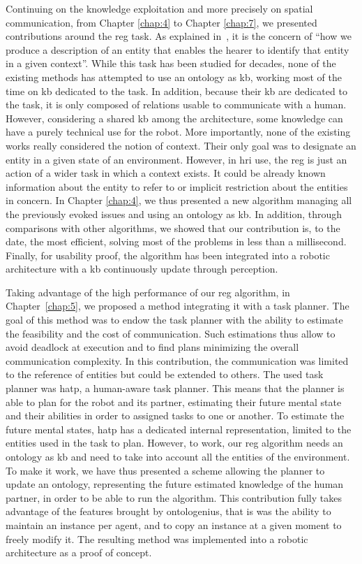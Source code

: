 Continuing on the knowledge exploitation and more precisely on spatial communication, from Chapter \ref{chap:4} to Chapter \ref{chap:7}, we presented contributions around the \acrfull{reg} task. As explained in~\cite{reiter_2000_building}, it is the concern of ``how we produce a description of an entity that enables the hearer to identify that entity in a given context''. While this task has been studied for decades, none of the existing methods has attempted to use an ontology as \acrshort{kb}, working most of the time on \acrshort{kb} dedicated to the task. In addition, because their \acrshort{kb} are dedicated to the task, it is only composed of relations usable to communicate with a human. However, considering a shared \acrshort{kb} among the architecture, some knowledge can have a purely technical use for the robot. More importantly, none of the existing works really considered the notion of context. Their only goal was to designate an entity in a given state of an environment. However, in \acrshort{hri} use, the \acrshort{reg} is just an action of a wider task in which a context exists. It could be already known information about the entity to refer to or implicit restriction about the entities in concern. In Chapter \ref{chap:4}, we thus presented a new algorithm managing all the previously evoked issues and using an ontology as \acrshort{kb}. In addition, through comparisons with other algorithms, we showed that our contribution is, to the date, the most efficient, solving most of the problems in less than a millisecond. Finally, for usability proof, the algorithm has been integrated into a robotic architecture with a \acrshort{kb} continuously update through perception.

Taking advantage of the high performance of our \acrshort{reg} algorithm, in Chapter~\ref{chap:5}, we proposed a method integrating it with a task planner. The goal of this method was to endow the task planner with the ability to estimate the feasibility and the cost of communication. Such estimations thus allow to avoid deadlock at execution and to find plans minimizing the overall communication complexity. In this contribution, the communication was limited to the reference of entities but could be extended to others. The used task planner was \acrshort{hatp}, a human-aware task planner. This means that the planner is able to plan for the robot and its partner, estimating their future mental state and their abilities in order to assigned tasks to one or another. To estimate the future mental states, \acrshort{hatp} has a dedicated internal representation, limited to the entities used in the task to plan. However, to work, our \acrshort{reg} algorithm needs an ontology as \acrshort{kb} and need to take into account all the entities of the environment. To make it work, we have thus presented a scheme allowing the planner to update an ontology, representing the future estimated knowledge of the human partner, in order to be able to run the algorithm. This contribution fully takes advantage of the features brought by ontologenius, that is was the ability to maintain an instance per agent, and to copy an instance at a given moment to freely modify it. The resulting method was implemented into a robotic architecture as a proof of concept.

